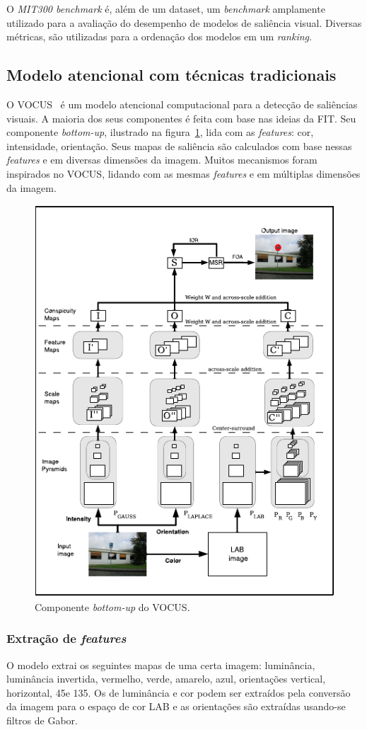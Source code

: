 \documentclass[11pt]{article}
\newcommand{\tit}[1]{\textit{#1}}
\begin{document}
O \tit{MIT300 benchmark} é, além de um dataset, um \tit{benchmark} amplamente
utilizado para a avaliação do desempenho de modelos de saliência visual.
Diversas métricas, são utilizadas para a ordenação dos modelos em um
\tit{ranking}.

\subsection{Modelo atencional com técnicas tradicionais}
O VOCUS~\cite{Frintrop2006} é um modelo atencional computacional
para a detecção de saliências visuais.
A maioria dos seus componentes é feita com base nas ideias da FIT\@.
Seu componente \tit{bottom-up}, ilustrado na figura~\ref{fig:vocus},
lida com as \tit{features}: cor, intensidade, orientação.
Seus mapas de saliência são calculados com base nessas \tit{features}
e em diversas dimensões da imagem.
Muitos mecanismos foram inspirados no VOCUS, lidando com as mesmas
\tit{features} e em múltiplas dimensões da imagem.

\begin{figure}[H]
\begin{center}
    \includegraphics[width=0.6\linewidth]{img/vocus.png}
\end{center}
\caption{Componente \tit{bottom-up} do VOCUS.}
\label{fig:vocus}
\end{figure}

\subsubsection{Extração de \tit{features}}
O modelo extrai os seguintes mapas de uma certa imagem:
luminância, luminância invertida, vermelho, verde, amarelo, azul,
orientações vertical, horizontal, 45\degree e 135\degree.
Os de luminância e cor podem ser extraídos pela conversão da imagem para o
espaço de cor LAB e as orientações são extraídas usando-se filtros de Gabor.
\end{document}
